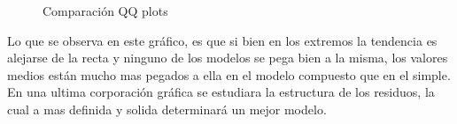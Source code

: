 \begin{figure}[h]
\centering
{}%
\hspace{0.25cm}%
\caption{Comparación QQ plots}
\label{qqplots_comparativa}
\end{figure}




Lo que se observa en este gráfico, es que si bien en los extremos la tendencia es alejarse de la recta y ninguno de los modelos se pega bien a la misma, los valores medios están mucho mas pegados a ella en el modelo compuesto que en el simple. \\

En una ultima corporación gráfica se estudiara la estructura de los residuos, la cual a mas definida y solida determinará un mejor modelo.



